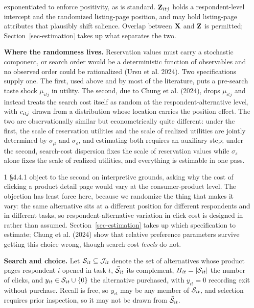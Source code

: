 \documentclass[
  letterpaper,
  DIV=11,
  numbers=noendperiod]{scrartcl}
\begin{document}
exponentiated to enforce positivity, as is standard. \(\mathbf{Z}_{itj}\)
holds a respondent-level intercept and the randomized listing-page
position, and may hold listing-page attributes that plausibly shift
salience. Overlap between \(\mathbf{X}\) and \(\mathbf{Z}\) is permitted;
Section~\ref{sec-estimation} takes up what separates the two.

\textbf{Where the randomness lives.} Reservation values must carry a
stochastic component, or search order would be a deterministic function
of observables and no observed order could be rationalized (Ursu et al.
2024). Two specifications supply one. The first, used above and by most
of the literature, puts a pre-search taste shock \(\mu_{itj}\) in
utility. The second, due to Chung et al. (2024), drops \(\mu_{itj}\) and
instead treats the search cost itself as random at the
respondent-alternative level, with \(c_{itj}\) drawn from a
distribution whose location carries the position effect. The two are
observationally similar but econometrically quite different: under the
first, the scale of reservation utilities and the scale of realized
utilities are jointly determined by \(\sigma_\mu\) and
\(\sigma_\varepsilon\), and estimating both requires an auxiliary step;
under the second, search-cost dispersion fixes the scale of reservation
values while \(\sigma_\varepsilon\) alone fixes the scale of realized
utilities, and everything is estimable in one pass.

1 §4.4.1 object to the second on interpretive grounds, asking why the
cost of clicking a product detail page would vary at the
consumer-product level. The objection has least force here, because we
randomize the thing that makes it vary: the same alternative sits at a
different position for different respondents and in different tasks, so
respondent-alternative variation in click cost is designed in rather
than assumed. Section~\ref{sec-estimation} takes up which specification
to estimate; Chung et al. (2024) show that relative preference
parameters survive getting this choice wrong, though search-cost
\emph{levels} do not.

\textbf{Search and choice.} Let \(\mathcal{S}_{it} \subseteq \mathcal{J}_{it}\)
denote the set of alternatives whose product pages respondent \(i\)
opened in task \(t\), \(\bar{\mathcal{S}}_{it}\) its complement,
\(H_{it} = |\mathcal{S}_{it}|\) the number of clicks, and
\(y_{it} \in \mathcal{S}_{it} \cup \{0\}\) the alternative purchased, with
\(y_{it}=0\) recording exit without purchase. Recall is free, so
\(y_{it}\) may be any member of \(\mathcal{S}_{it}\), and selection requires
prior inspection, so it may not be drawn from \(\bar{\mathcal{S}}_{it}\).
\end{document}
